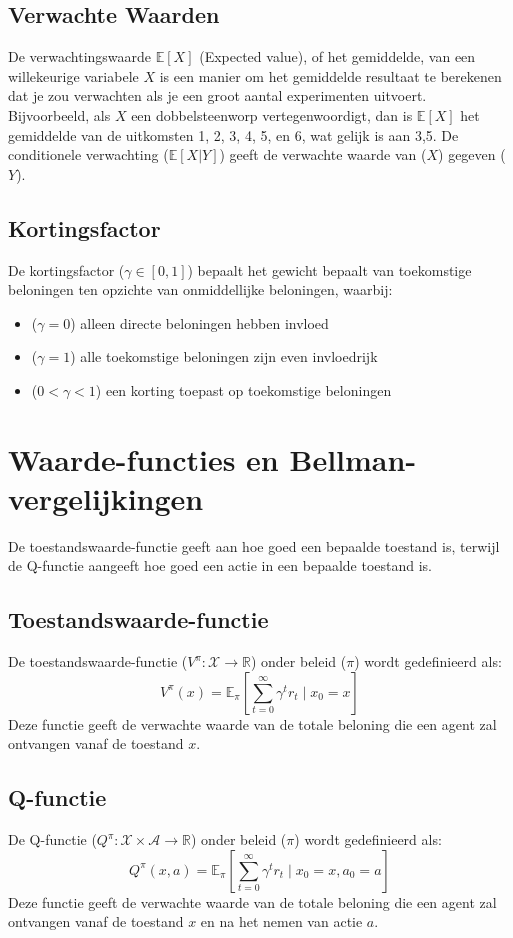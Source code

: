 \documentclass[a4paper,12pt]{report}
\begin{document}
\subsection{Verwachte Waarden}
De verwachtingswaarde \(\mathbb{E}[X]\) (Expected value), of het gemiddelde,
van een willekeurige variabele \(X\) is een manier om het gemiddelde resultaat
te berekenen dat je zou verwachten als je een groot aantal experimenten
uitvoert. Bijvoorbeeld, als \(X\) een dobbelsteenworp vertegenwoordigt, dan is
\(\mathbb{E}[X]\) het gemiddelde van de uitkomsten 1, 2, 3, 4, 5, en 6, wat
gelijk is aan 3,5. De conditionele verwachting (\(\mathbb{E}[X|Y]\)) geeft de
verwachte waarde van (\(X\)) gegeven (\(Y\)).

\subsection{Kortingsfactor}
De kortingsfactor (\(\gamma \in [0,1]\)) bepaalt het gewicht bepaalt van
toekomstige beloningen ten opzichte van onmiddellijke beloningen, waarbij:

\begin{itemize}
    \item (\(\gamma = 0\)) alleen directe beloningen hebben invloed
    \item (\(\gamma = 1\)) alle toekomstige beloningen zijn even invloedrijk
    \item (\(0 < \gamma < 1\)) een korting toepast op toekomstige beloningen
\end{itemize}

\section{Waarde-functies en Bellman-vergelijkingen}
De toestandswaarde-functie geeft aan hoe goed een bepaalde toestand is, terwijl
de Q-functie aangeeft hoe goed een actie in een bepaalde toestand is.
\subsection{Toestandswaarde-functie}
De toestandswaarde-functie (\(V^\pi: \mathcal{X} \to \mathbb{R}\)) onder beleid
(\(\pi\)) wordt gedefinieerd als:
\[
    V^\pi(x) = \mathbb{E}_\pi\left[\sum_{t=0}^\infty \gamma^t r_t \mid x_0 = x\right]
\]
Deze functie geeft de verwachte waarde van de totale beloning die een agent zal
ontvangen vanaf de toestand \(x\).
\subsection{Q-functie}
De Q-functie (\(Q^\pi: \mathcal{X} \times \mathcal{A} \to \mathbb{R}\)) onder
beleid (\(\pi\)) wordt gedefinieerd als:
\[
    Q^\pi(x,a) = \mathbb{E}_\pi\left[\sum_{t=0}^\infty \gamma^t r_t \mid x_0 = x, a_0 = a\right]
\]
Deze functie geeft de verwachte waarde van de totale beloning die een agent zal
ontvangen vanaf de toestand \(x\) en na het nemen van actie \(a\).
\end{document}
